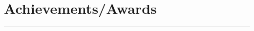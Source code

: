 \documentclass[]{sahana}
\begin{document}
\begin{minipage}[t]{0.66\textwidth}
\section{Achievements/Awards} 
\noindent\rule{12.5cm}{0.4pt}

\end{minipage} 
\end{document}
